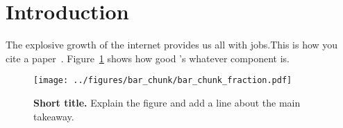 \section{Introduction}
\label{sec:intro}

The explosive growth of the internet provides us all with jobs.\footnotemark[1]
This is how you cite a paper~\cite{Walls:2011a}. Figure~\ref{fig:bar} shows how
good \sysname's whatever component is.


\Blindtext[3]

\begin{figure}[t]
\centering
\texttt{[image: ../figures/bar\_chunk/bar\_chunk\_fraction.pdf]}
\caption{\textbf{Short title.} Explain the figure and add a line about the main takeaway.}
\label{fig:bar}
\end{figure} 


